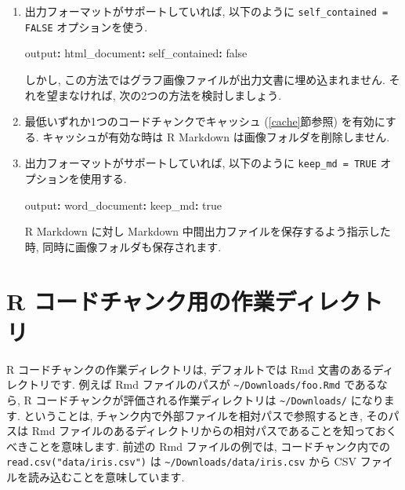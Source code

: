 \documentclass[
  11pt,
  lualatex,
  ja=standard]{bxjsreport}
\newenvironment{Shaded}{\begin{snugshade}}{\end{snugshade}}
\newcommand{\AttributeTok}[1]{\textcolor[rgb]{0.77,0.63,0.00}{#1}}
\newcommand{\CharTok}[1]{\textcolor[rgb]{0.31,0.60,0.02}{#1}}
\newcommand{\FunctionTok}[1]{\textcolor[rgb]{0.00,0.00,0.00}{#1}}
\newcommand{\KeywordTok}[1]{\textcolor[rgb]{0.13,0.29,0.53}{\textbf{#1}}}
\begin{document}
\begin{enumerate}
\def\labelenumi{\arabic{enumi}.}
\item
  出力フォーマットがサポートしていれば, 以下のように \texttt{self\_contained = FALSE} オプションを使う.

\begin{Shaded}
\begin{Highlighting}[]
\FunctionTok{output}\KeywordTok{:}
\AttributeTok{  }\FunctionTok{html\_document}\KeywordTok{:}
\AttributeTok{    }\FunctionTok{self\_contained}\KeywordTok{:}\AttributeTok{ }\CharTok{false}
\end{Highlighting}
\end{Shaded}

  しかし, この方法ではグラフ画像ファイルが出力文書に埋め込まれません. それを望まなければ, 次の2つの方法を検討しましょう.
\item
  最低いずれか1つのコードチャンクでキャッシュ (\ref{cache}節参照) を有効にする. キャッシュが有効な時は R Markdown は画像フォルダを削除しません.
\item
  出力フォーマットがサポートしていれば, 以下のように \texttt{keep\_md = TRUE} オプションを使用する.

\begin{Shaded}
\begin{Highlighting}[]
\FunctionTok{output}\KeywordTok{:}
\AttributeTok{  }\FunctionTok{word\_document}\KeywordTok{:}
\AttributeTok{    }\FunctionTok{keep\_md}\KeywordTok{:}\AttributeTok{ }\CharTok{true}
\end{Highlighting}
\end{Shaded}

  R Markdown に対し Markdown 中間出力ファイルを保存するよう指示した時, 同時に画像フォルダも保存されます.
\end{enumerate}

\hypertarget{working-directory}{%
\section{R コードチャンク用の作業ディレクトリ}\label{working-directory}}

R コードチャンクの作業ディレクトリは, デフォルトでは Rmd 文書のあるディレクトリです. 例えば Rmd ファイルのパスが \texttt{\textasciitilde{}/Downloads/foo.Rmd} であるなら, R コードチャンクが評価される作業ディレクトリは \texttt{\textasciitilde{}/Downloads/} になります. ということは, チャンク内で外部ファイルを相対パスで参照するとき, そのパスは Rmd ファイルのあるディレクトリからの相対パスであることを知っておくべきことを意味します. 前述の Rmd ファイルの例では, コードチャンク内での \texttt{read.csv("data/iris.csv")} は \texttt{\textasciitilde{}/Downloads/data/iris.csv} から CSV ファイルを読み込むことを意味しています.
\end{document}

